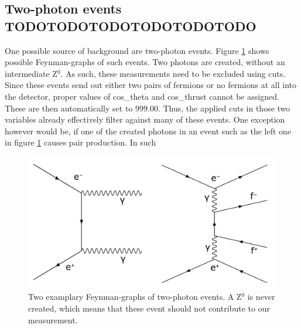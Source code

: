 \subsection{Two-photon events TODOTODOTODOTODOTODOTODO}
One possible source of background are two-photon events. Figure \ref{fig:twophotonfeynman} shows possible Feynman-graphs of such events. Two photons are created, without an intermediate Z$^0$. As such, these measurements need to be excluded using cuts.\\
Since these events send out either two pairs of fermions or no fermions at all into the detector, proper values of cos\_theta and cos\_thrust cannot be assigned. These are then automatically set to $999.00$. Thus, the applied cuts in those two variables already effectively filter against many of these events. One exception however would be, if one of the created photons in an event such as the left one in figure \ref{fig:twophotonfeynman} causes pair production. In such 
\begin{figure}[H]
\centering
\includegraphics[width=1.0\linewidth]{graphics/twophotonfeynman_both.pdf}
\caption[Two-photon Feynman-graph]{Two examplary Feynman-graphs of two-photon events. A Z$^0$ is never created, which means that these event should not contribute to our measurement.}
\label{fig:twophotonfeynman}
\end{figure}

\newpage
